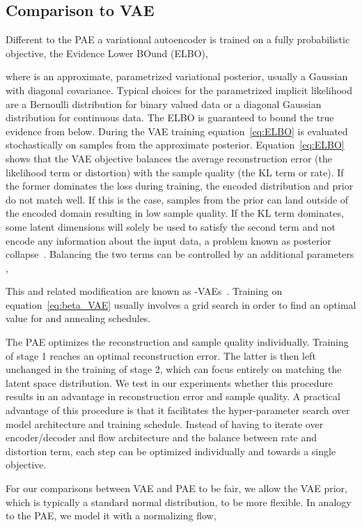 \documentclass[10pt]{article} \usepackage[accepted]{tmlr}
\begin{document}
\subsection{Comparison to VAE}
Different to the PAE a variational autoencoder is trained on a fully probabilistic objective, the Evidence Lower BOund (ELBO),

where  is an approximate, parametrized variational posterior, usually a Gaussian with diagonal covariance. Typical choices for the parametrized implicit likelihood  are a Bernoulli distribution for binary valued data or a diagonal Gaussian distribution for continuous data. The ELBO is guaranteed to bound the true evidence  from below.
During the VAE training equation~\ref{eq:ELBO} is evaluated stochastically on samples from the approximate posterior.
Equation~\ref{eq:ELBO} shows that the VAE objective balances the average reconstruction error (the likelihood term or distortion) with the sample quality (the KL term or rate). If the former dominates the loss during training, the encoded distribution and prior do not match well. If this is the case, samples from the prior can land outside of the encoded domain resulting in low sample quality. If the KL term dominates, some latent dimensions will solely be used to satisfy the second term and not encode any information about the input data, a problem known as posterior collapse~\citep{FixElbo}. 
Balancing the two terms can be controlled by an additional parameters ,

This and related modification are known as -VAEs~\citep{BowmanVVDJB16, Alemi2016, beta-VAE, Makhzani2015}. Training on equation~\ref{eq:beta_VAE} usually involves a grid search in order to find an optimal value for  and annealing schedules. 

The PAE optimizes the reconstruction and sample quality individually. Training of stage 1 reaches an optimal reconstruction error. The latter is then left unchanged in the training of stage 2, which can focus entirely on matching the latent space distribution. We test in our experiments whether this procedure results in an advantage in reconstruction error and sample quality. A practical advantage of this procedure is that it facilitates the hyper-parameter search over model architecture and training schedule. Instead of having to iterate over encoder/decoder and flow architecture and the balance between rate and distortion term, each step can be optimized individually and towards a single objective. 

For our comparisons between VAE and PAE to be fair, we allow the VAE prior, which is typically a standard normal distribution, to be more flexible. In analogy to the PAE, we model it with a normalizing flow,
\end{document}
